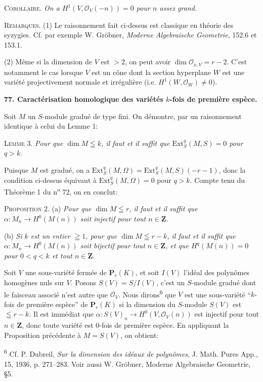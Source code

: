 \textsc{Corollaire}. \textit{On a $H^1(V, \mathcal{O}_V(-n)) = 0$ pour $n$ assez grand.}

\textsc{Remarques}. (1) Le raisonnement fait ci-dessus est classique en théorie des syzygies. Cf. par exemple W. Gröbner, \textit{Moderne Algebraische Geometrie}, 152.6 et 153.1.

(2) Même si la dimension de $V$ est $>2$, on peut avoir $\dim \mathcal{O}_{x,V} = r - 2$. C'est notamment le cas lorsque $V$ est un cône dont la section hyperplane $W$ est une variété projectivement normale et irrégulière (i.e. $H^1(W, \mathcal{O}_W) \neq 0$).


\textbf{77. Caractérisation homologique des variétés $k$-fois de première espèce.}

Soit $M$ un $S$-module gradué de type fini. On démontre, par un raisonnement identique à celui du Lemme 1:

\textsc{Lemme} 3. \textit{Pour que $\dim M \leqq k$, il faut et il suffit que $\mathrm{Ext}^q_S(M, S) = 0$ pour $q > k$.}

Puisque $M$ est gradué, on a $\mathrm{Ext}^q_S(M, \Omega) = \mathrm{Ext}^q_S(M, S)(-r - 1)$, donc la condition ci-dessus équivaut à $\mathrm{Ext}^q_S(M, \Omega) = 0$ pour $q > k$. Compte tenu du Théorème 1 du n\textsuperscript{o} 72, on en conclut:

\textsc{Proposition} 2. (a) \textit{Pour que $\dim M \leqq r$, il faut et il suffit que $\alpha : M_n \to H^0(M(n))$ soit injectif pour tout $n \in \mathbf{Z}$.}

(b) \textit{Si $k$ est un entier $\geqq 1$, pour que $\dim M \leqq r - k$, il faut et il suffit que $\alpha : M_n \to H^0(M(n))$ soit bijectif pour tout $n \in \mathbf{Z}$, et que $H^q(M(n)) = 0$ pour $0 < q < k$ et tout $n \in \mathbf{Z}$.}

Soit $V$ une sous-variété fermée de $\mathbf{P}_r(K)$, et soit $I(V)$ l'idéal des polynômes homogènes nuls sur $V$. Posons $S(V) = S/I(V)$, c'est un $S$-module gradué dont le faisceau associé n'est autre que $\mathcal{O}_V$. Nous dirons\textsuperscript{6} que $V$ est une sous-variété ``$k$-fois de première espèce'' de $\mathbf{P}_r(K)$ si la dimension du $S$-module $S(V)$ est $\leqq r - k$. Il est immédiat que $\alpha : S(V)_n \to H^0(V, \mathcal{O}_V(n))$ est injectif pour tout $n \in \mathbf{Z}$, donc toute variété est $0$-fois de première espèce. En appliquant la Proposition précédente à $M = S(V)$, on obtient:

\textsuperscript{6} Cf. P. Dubreil, \textit{Sur la dimension des idéaux de polynômes}, J. Math. Pures App., 15, 1936, p. 271--283. Voir aussi W. Gröbner, Moderne Algebraische Geometrie, \S5.


